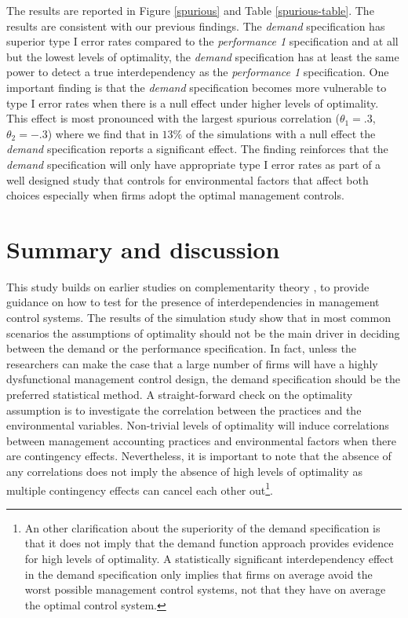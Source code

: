 \documentclass[12pt]{article}
\begin{document}
The results are reported in Figure \ref{spurious} and Table \ref{spurious-table}. The results are consistent with our previous findings. The \emph{demand} specification has superior type I error rates compared to the \emph{performance 1} specification and at all but the lowest levels of optimality, the \emph{demand} specification has at least the same power to detect a true interdependency as the \emph{performance 1} specification. One important finding is that the \emph{demand} specification becomes more vulnerable to type I error rates when there is a null effect under higher levels of optimality. This effect is most pronounced with the largest spurious correlation (\(\theta_1 = .3\), \(\theta_2 = -.3\)) where we find that in $13\%$ of the simulations with a null effect the \emph{demand} specification reports a significant effect. The finding reinforces that the \emph{demand} specification will only have appropriate type I error rates as part of a well designed study that controls for environmental factors that affect both choices especially when firms adopt the optimal management controls.

\section{Summary and discussion}\label{summary-and-discussion}

This study builds on earlier studies on complementarity theory \citep{Milgrom1995, Grabner2013}, to provide guidance on how to test for the presence of interdependencies in management control systems. The results of the simulation study show that in most common scenarios the assumptions of optimality should not be the main driver in deciding between the demand or the performance specification. In fact, unless the researchers can make the case that a large number of firms will have a highly dysfunctional management control design, the demand specification should be the preferred statistical method. A straight-forward check on the optimality assumption is to investigate the correlation between the practices and the environmental variables. Non-trivial levels of optimality will induce correlations between management accounting practices and environmental factors when there are contingency effects. Nevertheless, it is important to note that the absence of any correlations does not imply the absence of high levels of optimality as multiple contingency effects can cancel each other out\footnote{An other clarification about the superiority of the demand specification is that it does not imply that the demand function approach provides evidence for high levels of optimality. A statistically significant interdependency effect in the demand specification only implies that firms on average avoid the worst possible management control systems, not that they have on average the optimal control system.}.
\end{document}
